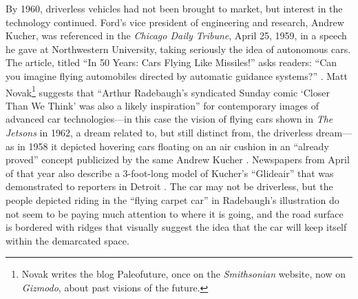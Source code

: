 By 1960, driverless vehicles had not been brought to market, but
interest in the technology continued. Ford's vice president of
engineering and research, Andrew Kucher, was referenced in the \emph{Chicago
Daily Tribune}, April 25, 1959, in a speech he gave at Northwestern
University, taking seriously the idea of autonomous cars. The article,
titled ``In 50 Years: Cars Flying Like Missiles!'' asks readers: ``Can
you imagine flying automobiles directed by automatic guidance
systems?'' \cite{tribuneViaPaleo}. Matt Novak\footnote{Novak writes the
 blog Paleofuture, once on the \emph{Smithsonian} website, now on \emph{Gizmodo},
 about past visions of the future.} suggests that ``Arthur Radebaugh's syndicated
Sunday comic `Closer Than We Think' was also a likely inspiration''
for contemporary images of advanced car technologies---in this case
the vision of flying cars shown in \emph{The Jetsons} in 1962, a
dream related to, but still distinct from, the driverless dream---as in
1958 it depicted hovering 
cars floating on an air cushion in an ``already proved'' concept
publicized by the same Andrew Kucher \cite{novakRecapping}. Newspapers
from April of that 
year also describe a 3-foot-long model of Kucher's ``Glideair'' that was
demonstrated to reporters in Detroit \cite{novakFlying}. The car may
not be driverless, 
but the people depicted riding in the ``flying carpet car'' in
Radebaugh's illustration do not seem to be paying much attention to
where it is going, and the road surface is bordered with ridges that
visually suggest the idea that the car will keep itself within the
demarcated space.

